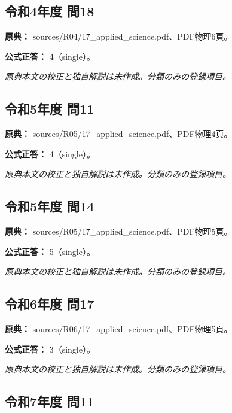 \subsection{令和4年度 問18}
\label{q:r04-reg-applied-18}

\noindent\textbf{原典：} sources/R04/17\_applied\_science.pdf、PDF物理6頁。

\textbf{公式正答：} 4（single）。

\par\textit{原典本文の校正と独自解説は未作成。分類のみの登録項目。}

\subsection{令和5年度 問11}
\label{q:r05-reg-applied-11}

\noindent\textbf{原典：} sources/R05/17\_applied\_science.pdf、PDF物理4頁。

\textbf{公式正答：} 4（single）。

\par\textit{原典本文の校正と独自解説は未作成。分類のみの登録項目。}

\subsection{令和5年度 問14}
\label{q:r05-reg-applied-14}

\noindent\textbf{原典：} sources/R05/17\_applied\_science.pdf、PDF物理5頁。

\textbf{公式正答：} 5（single）。

\par\textit{原典本文の校正と独自解説は未作成。分類のみの登録項目。}

\subsection{令和6年度 問17}
\label{q:r06-reg-applied-17}

\noindent\textbf{原典：} sources/R06/17\_applied\_science.pdf、PDF物理5頁。

\textbf{公式正答：} 3（single）。

\par\textit{原典本文の校正と独自解説は未作成。分類のみの登録項目。}

\subsection{令和7年度 問11}
\label{q:r07-reg-applied-11}

